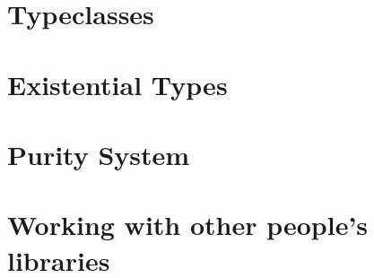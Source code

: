 \section{Typeclasses}

\section{Existential Types}

\section{Purity System}

\section{Working with other people's libraries}


